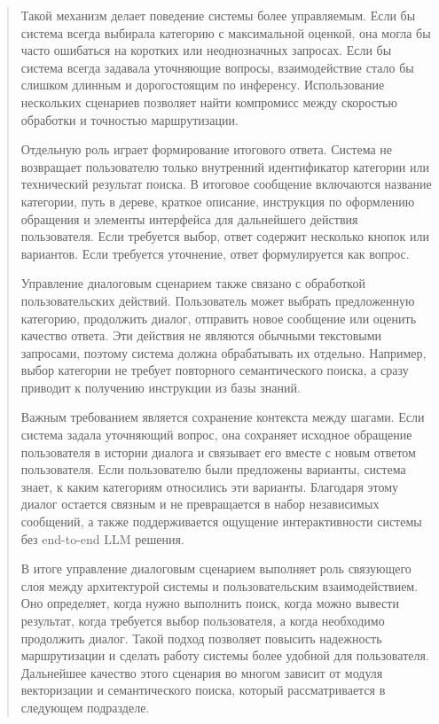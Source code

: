 \documentclass[
]{article}
\begin{document}
\begin{quote}
Такой механизм делает поведение системы более управляемым. Если бы
система всегда выбирала категорию с максимальной оценкой, она могла бы
часто ошибаться на коротких или неоднозначных запросах. Если бы система
всегда задавала уточняющие вопросы, взаимодействие стало бы слишком
длинным и дорогостоящим по инференсу. Использование нескольких сценариев
позволяет найти компромисс между скоростью обработки и точностью
маршрутизации.

Отдельную роль играет формирование итогового ответа. Система не
возвращает пользователю только внутренний идентификатор категории или
технический результат поиска. В итоговое сообщение включаются название
категории, путь в дереве, краткое описание, инструкция по оформлению
обращения и элементы интерфейса для дальнейшего действия пользователя.
Если требуется выбор, ответ содержит несколько кнопок или вариантов.
Если требуется уточнение, ответ формулируется как вопрос.

Управление диалоговым сценарием также связано с обработкой
пользовательских действий. Пользователь может выбрать предложенную
категорию, продолжить диалог, отправить новое сообщение или оценить
качество ответа. Эти действия не являются обычными текстовыми запросами,
поэтому система должна обрабатывать их отдельно. Например, выбор
категории не требует повторного семантического поиска, а сразу приводит
к получению инструкции из базы знаний.

Важным требованием является сохранение контекста между шагами. Если
система задала уточняющий вопрос, она сохраняет исходное обращение
пользователя в истории диалога и связывает его вместе с новым ответом
пользователя. Если пользователю были предложены варианты, система знает,
к каким категориям относились эти варианты. Благодаря этому диалог
остается связным и не превращается в набор независимых сообщений, а
также поддерживается ощущение интерактивности системы без end-to-end LLM
решения.

В итоге управление диалоговым сценарием выполняет роль связующего слоя
между архитектурой системы и пользовательским взаимодействием. Оно
определяет, когда нужно выполнить поиск, когда можно вывести результат,
когда требуется выбор пользователя, а когда необходимо продолжить
диалог. Такой подход позволяет повысить надежность маршрутизации и
сделать работу системы более удобной для пользователя. Дальнейшее
качество этого сценария во многом зависит от модуля векторизации и
семантического поиска, который рассматривается в следующем подразделе.
\end{quote}
\end{document}

